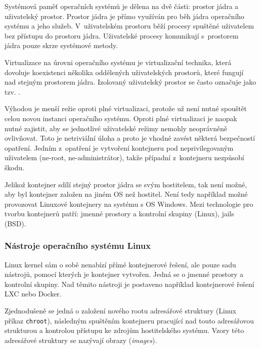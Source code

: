 Systémová paměť operačních systémů je dělena na dvě části: prostor jádra a uživatelský prostor.
Prostor jádra je přímo využíván pro běh jádra operačního systému a jeho služeb.
V~uživatelském prostoru běží procesy spuštěné uživatelem bez přístupu do prostoru jádra.
Uživatelské procesy komunikují s~prostorem jádra pouze skrze systémové metody.
\cite{kernel_space}


Virtualizace na úrovni operačního systému je virtualizační technika, která dovoluje koexistenci několika oddělených uživatelských prostorů, které fungují nad stejným prostorem jádra.
Izolovaný uživatelský prostor se často označuje jako tzv. .

Výhodou je menší režie oproti plné virtualizaci, protože už není nutné spouštět celou novou instanci operačního systému.
Oproti plné virtualizaci je naopak nutné zajistit, aby se jednotlivé uživatelské režimy nemohly neoprávněně ovlivňovat.
Toto je netriviální úloha a proto je vhodné zavést některá bezpečností opatření.
Jedním z~opatření je vytvoření kontejneru pod neprivilegovaným uživatelem (ne-root, ne-administrátor), takže případní  z~kontejneru nezpůsobí škodu.

Jelikož kontejner sdílí stejný prostor jádra se svým hostitelem, tak není možné, aby byl kontejner založen na jiném OS než hostitel.
Není tedy například možné provozovat Linuxové kontejnery na systému s OS Windows.
Mezi technologie pro tvorbu kontejnerů patří: jmenné prostory a kontrolní skupiny (Linux), jails (BSD).


\subsubsection{Nástroje operačního systému Linux}

Linux kernel sám o sobě nenabízí přímé kontejnerové řešení, ale pouze sadu nástrojů, pomocí kterých je kontejner vytvořen.
Jedná se o jmenné prostory a kontrolní skupiny.
Nad těmito nástroji je postaveno například kontejnerové řešení LXC nebo Docker.

Zjednodušeně se jedná o založení nového rootu adresářové struktury (Linux příkaz \verb|chroot|), následným spuštěním kontejneru pracující nad touto adresářovou strukturou a kontrolou přístupu ke zdrojům hostitelského systému.
Vzory této adresářové struktury se nazývají obrazy (\textit{images}).

